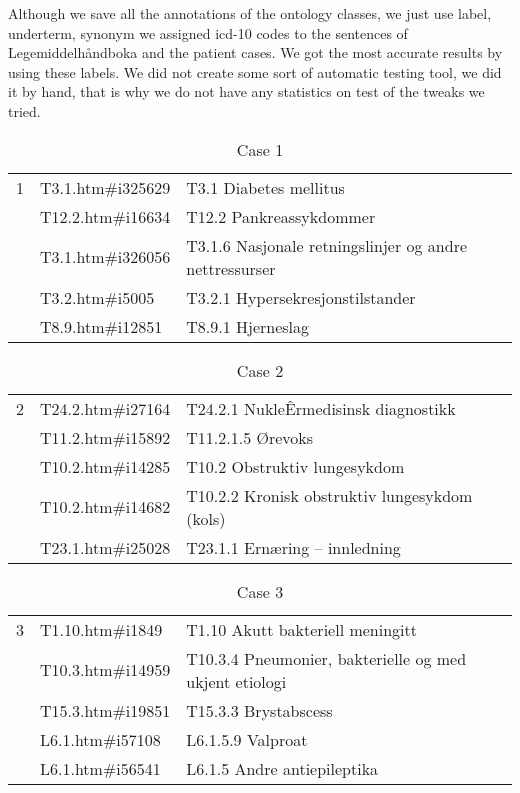 Although we save all the annotations of the ontology classes, we just use label,
underterm, synonym we assigned icd-10 codes to the sentences of
Legemiddelhåndboka and the patient cases. We got the most accurate results by
using these labels. We did not create some sort of automatic testing tool, we
did it by hand, that is why we do not have any statistics on test of the tweaks
we tried.
\begin{table}[htbp]\center
\caption{Case 1}
\begin{tabular}{cll}
\toprule
1 & T3.1.htm\#i325629  & T3.1 Diabetes mellitus \\
  & T12.2.htm\#i16634  & T12.2 Pankreassykdommer \\
  & T3.1.htm\#i326056  & T3.1.6 Nasjonale retningslinjer og andre nettressurser \\
  & T3.2.htm\#i5005    & T3.2.1 Hypersekresjonstilstander \\
  & T8.9.htm\#i12851   & T8.9.1 Hjerneslag \\
\bottomrule
\end{tabular}
\end{table}
\begin{table}[htbp]\center
\caption{Case 2}
\begin{tabular}{cll}
\toprule
2 & T24.2.htm\#i27164  & T24.2.1 NukleÊrmedisinsk diagnostikk \\
  & T11.2.htm\#i15892  & T11.2.1.5 Ørevoks \\
  & T10.2.htm\#i14285  & T10.2  Obstruktiv lungesykdom \\
  & T10.2.htm\#i14682  & T10.2.2 Kronisk obstruktiv lungesykdom (kols) \\
  & T23.1.htm\#i25028  & T23.1.1 Ernæring – innledning \\
\bottomrule
\end{tabular}
\end{table}
\begin{table}[htbp]\center
\caption{Case 3}
\begin{tabular}{cll}
\toprule
3 & T1.10.htm\#i1849   & T1.10 Akutt bakteriell meningitt \\
  & T10.3.htm\#i14959  & T10.3.4  Pneumonier, bakterielle og med ukjent etiologi \\
  & T15.3.htm\#i19851  & T15.3.3 Brystabscess \\
  & L6.1.htm\#i57108   & L6.1.5.9 Valproat \\
  & L6.1.htm\#i56541   & L6.1.5 Andre antiepileptika \\
\bottomrule
\end{tabular}
\end{table}
